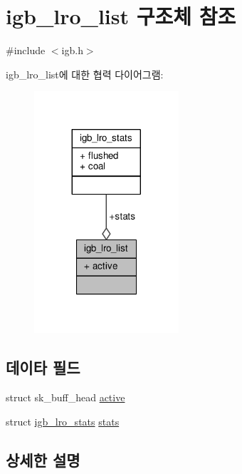 \hypertarget{structigb__lro__list}{}\section{igb\+\_\+lro\+\_\+list 구조체 참조}
\label{structigb__lro__list}


{\ttfamily \#include $<$igb.\+h$>$}



igb\+\_\+lro\+\_\+list에 대한 협력 다이어그램\+:
\nopagebreak
\begin{figure}[H]
\begin{center}
\leavevmode
\includegraphics[width=152pt]{structigb__lro__list__coll__graph}
\end{center}
\end{figure}
\subsection*{데이타 필드}
\begin{DoxyCompactItemize}
\item 
struct sk\+\_\+buff\+\_\+head \hyperlink{structigb__lro__list_a39e915df2bf9d01371a2e69f5587edd7}{active}
\item 
struct \hyperlink{structigb__lro__stats}{igb\+\_\+lro\+\_\+stats} \hyperlink{structigb__lro__list_a6f054dd96e8c1605385e4fea3ac0d1da}{stats}
\end{DoxyCompactItemize}


\subsection{상세한 설명}


